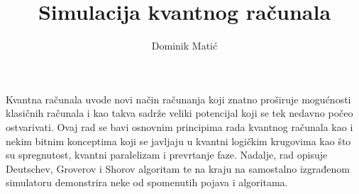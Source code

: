 \documentclass[times, utf8, zavrsni, numeric]{fer}
\begin{document}

\title{Simulacija kvantnog računala}

\author{Dominik Matić}

\maketitle


\zahvala{}

\tableofcontents
 














\begin{sazetak}
Kvantna računala uvode novi način računanja koji znatno proširuje mogućnosti klasičnih računala i kao takva sadrže veliki potencijal koji se tek nedavno počeo ostvarivati. Ovaj rad se bavi osnovnim principima rada kvantnog računala kao i nekim bitnim konceptima koji se javljaju u kvantni logičkim krugovima kao što su spregnutost, kvantni paralelizam i prevrtanje faze. Nadalje, rad opisuje Deutschev, Groverov i Shorov algoritam te na kraju na samostalno izgrađenom simulatoru demonstrira neke od spomenutih pojava i algoritama.

\end{sazetak}
\end{document}

